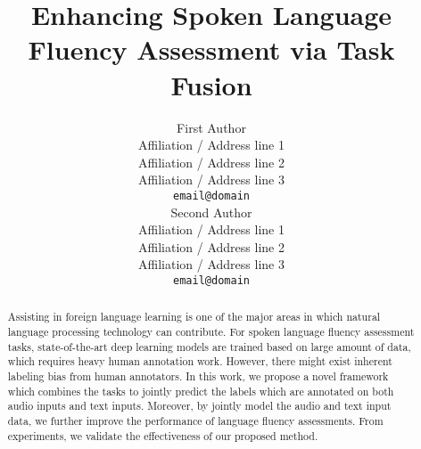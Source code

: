 \documentclass[11pt,a4paper]{article}
\title{Enhancing Spoken Language Fluency Assessment via Task Fusion}
\author{First Author \\
  Affiliation / Address line 1 \\
  Affiliation / Address line 2 \\
  Affiliation / Address line 3 \\
  \texttt{email@domain} \\\And
  Second Author \\
  Affiliation / Address line 1 \\
  Affiliation / Address line 2 \\
  Affiliation / Address line 3 \\
  \texttt{email@domain} \\}
\date{}
\begin{document}
\maketitle
\begin{abstract}
Assisting in foreign language learning is one of
the major areas in which natural language processing technology can contribute. For spoken language fluency assessment tasks, state-of-the-art deep learning models are trained based on large amount of data, which requires heavy human annotation work. However, there might exist inherent labeling bias from human annotators. In this work, we propose a novel framework which combines the tasks to jointly predict the labels which are annotated on both audio inputs and text inputs. Moreover, by jointly model the audio and text input data, we further improve the performance of language fluency assessments. From experiments, we validate the effectiveness of our proposed method.


\end{abstract}





\newpage





\newpage



\end{document}
